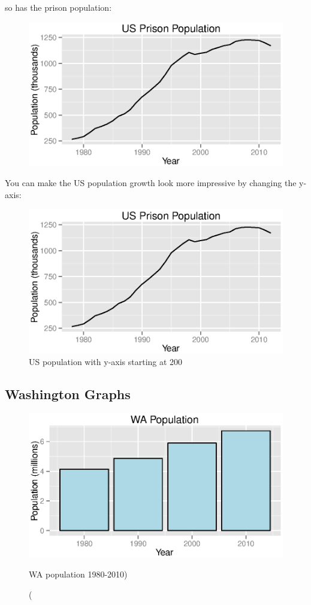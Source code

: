 \documentclass{exam}
\begin{document}
  so has the prison population:
  \begin{figure}[H]
    \centering
    \includegraphics[scale = 0.9]{figures/us_prison_population.eps}
  \end{figure}

  You can make the US population growth look more impressive by changing the y-axis:
  \begin{figure}[H]
    \centering
    \includegraphics[scale = 0.9]{figures/us_prison_population.eps}
    \caption{US population with y-axis starting at 200}
  \end{figure}

  \subsection{Washington Graphs}

  \begin{figure}[H]
    \centering
    \includegraphics[scale = 0.9]{figures/wa_population.eps}
    \caption(WA population 1980-2010)
  \end{figure}
\end{document}
